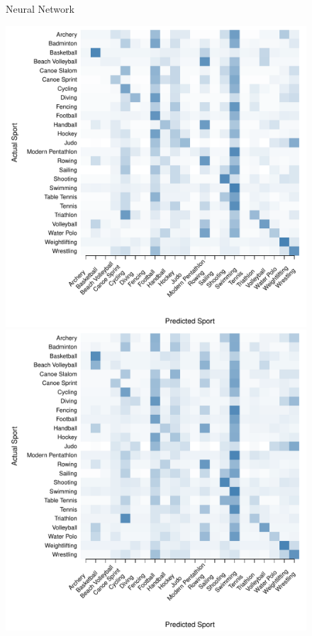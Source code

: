 \begin{figure}
\begin{center}
    Neural Network \\
  \begin{minipage}{0.20\textwidth}
    \begin{center}
      \includegraphics[scale=0.20]{../graphics/sportANN-trn.pdf}
    \end{center}
  \end{minipage}
  \hspace{0.05\textwidth}
  \begin{minipage}{0.20\textwidth}
    \begin{center}
      \includegraphics[scale=0.20]{../graphics/sportANN-tst.pdf}

\end{center}
\end{minipage}
\end{center}
\end{figure}
